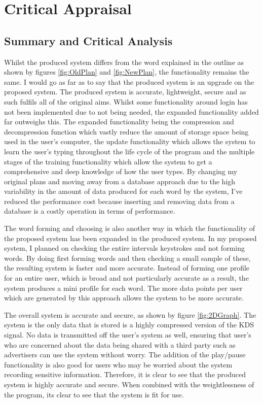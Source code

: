 \documentclass[10pt,a4paper]{report}
\begin{document}
\chapter{Critical Appraisal}




\section{Summary and Critical Analysis}

 Whilst the produced system differs from the word explained in the outline as shown by figures \ref{fig:OldPlan} and \ref{fig:NewPlan}, the functionality remains the same. I would go as far as to say that the produced system is an upgrade on the proposed system. The produced system is accurate, lightweight, secure and as such fulfils all of the original aims. Whilst some functionality around login has not been implemented due to not being needed, the expanded functionality added far outweighs this. The expanded functionality being the compression and decompression function which vastly reduce the amount of storage space being used in the user's computer, the update functionality which allows the system to learn the user's typing throughout the life cycle of the program and the multiple stages of the training functionality which allow the system to get a comprehensive and deep knowledge of how the user types. By changing my original plans and moving away from a database approach due to the high variability in the amount of data produced for each word by the system, I've reduced the performance cost because inserting and removing data from a database is a costly operation in terms of performance.

The word forming and choosing is also another way in which the functionality of the proposed system has been expanded in the produced system. In my proposed system, I planned on checking the entire intervals keystrokes and not forming words. By doing first forming words and then checking a small sample of these, the resulting system is faster and more accurate. Instead of forming one profile for an entire user, which is broad and not particularly accurate as a result, the system produces a mini profile for each word. The more data points per user which are generated by this approach allows the system to be more accurate.

The overall system is accurate and secure, as shown by figure \ref{fig:2DGraph}. The system is the only data that is stored is a highly compressed version of the KDS signal. No data is transmitted off the user's system as well, ensuring that user's who are concerned about the data being shared with a third party such as advertisers can use the system without worry. The addition of the play/pause functionality is also good for users who may be worried about the system recording sensitive information. Therefore, it is clear to see that the produced system is highly accurate and secure. When combined with the weightlessness of the program, its clear to see that the system is fit for use.
\end{document}
